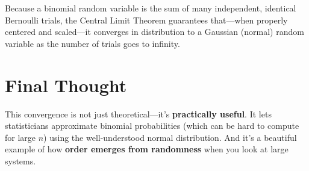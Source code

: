 \documentclass[12pt]{article}
\begin{document}
Because a binomial random variable is the sum of many independent, identical Bernoulli trials, the Central Limit Theorem guarantees that—when properly centered and scaled—it converges in distribution to a Gaussian (normal) random variable as the number of trials goes to infinity.

\section*{Final Thought}

This convergence is not just theoretical—it’s \textbf{practically useful}. It lets statisticians approximate binomial probabilities (which can be hard to compute for large $n$) using the well-understood normal distribution. And it’s a beautiful example of how \textbf{order emerges from randomness} when you look at large systems.
\end{document}
